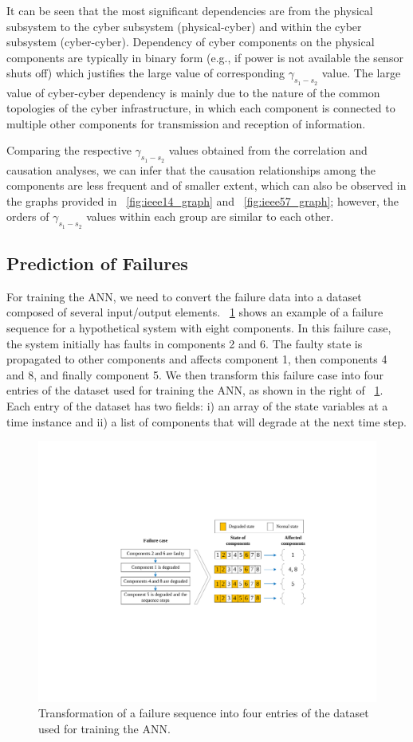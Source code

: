 \documentclass[12pt]{elsarticle}
\begin{document}
It can be seen that the most significant dependencies are from the physical subsystem to the cyber subsystem (physical-cyber) and within the cyber subsystem (cyber-cyber). Dependency of cyber components on the physical components are typically in binary form (e.g., if power is not available the sensor shuts off) which justifies the large value of corresponding $\gamma_{s_1-s_2}$ value. The large value of cyber-cyber dependency is mainly due to the nature of the common topologies of the cyber infrastructure, in which each component is connected to multiple other components for transmission and reception of information.

Comparing the respective $\gamma_{s_1-s_2}$ values obtained from the correlation and causation analyses, we can infer that the causation relationships among the components are less frequent and of smaller extent, which can also be observed in the graphs provided in \figurename~\ref{fig:ieee14_graph} and \figurename~\ref{fig:ieee57_graph}; however, the orders of $\gamma_{s_1-s_2}$ values within each group are similar to each other.

\subsection{Prediction of Failures}
\label{sec:case_study:pred}
For training the ANN, we need to convert the failure data into a dataset composed of several input/output elements. \figurename~\ref{fig:failure_seq} shows an example of a failure sequence for a hypothetical system with eight components. In this failure case, the system initially has faults in components 2 and 6. The faulty state is propagated to other components and affects component 1, then components 4 and 8, and finally component 5. We then transform this failure case into four entries of the dataset used for training the ANN, as shown in the right of \figurename~\ref{fig:failure_seq}. Each entry of the dataset has two fields: i) an array of the state variables at a time instance and ii) a list of components that will degrade at the next time step.

\begin{figure}
\centering
\includegraphics[width=0.75\columnwidth]{failure_seq}
\caption{Transformation of a failure sequence into four entries of the dataset used for training the ANN.}
\label{fig:failure_seq}
\end{figure}
\end{document}
